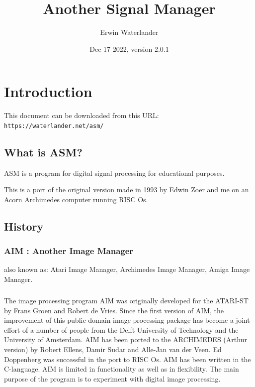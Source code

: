 \documentclass{report}
\title{Another Signal Manager}
\author{Erwin Waterlander}
\date{Dec 17 2022, version 2.0.1}          %
\begin{document}

\maketitle                   %

\tableofcontents

\chapter{Introduction}\label{chap:intro}

This document can be downloaded from this URL:\\
\texttt{https://waterlander.net/asm/}


\section{What is ASM?}


ASM is a program for digital signal processing for educational
purposes.

This is a port of the original version made in 1993 by Edwin Zoer and me on an
Acorn Archimedes computer running RISC Os.

\section{History}

\subsection{AIM : Another Image Manager}

also known as:
Atari Image Manager,
Archimedes Image Manager,
Amiga Image Manager. 

\paragraph{}
The image processing program AIM was originally developed for the 
ATARI-ST  by Frans Groen and  Robert de Vries.  Since  the  first 
version  of  AIM, the improvement of  this  public  domain  image 
processing  package  has  become a joint effort of  a  number  of 
people from the Delft University of Technology and the University 
of  Amsterdam.
AIM has been ported to the ARCHIMEDES (Arthur version) by  Robert
Ellens, Damir Sudar and Alle-Jan van der Veen.
Ed Doppenberg  was successful in the port to RISC Os. 
AIM has been written in the C-language. 
AIM is limited in functionality as well as in flexibility.
The main  purpose of the program is to experiment with digital
image processing.
\end{document}
